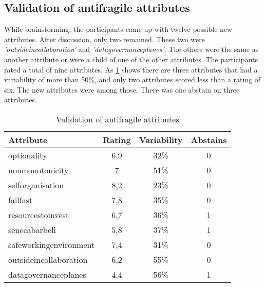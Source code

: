 \subsection{Validation of antifragile attributes}
\label{sub:validationofantifragileattributes}
While brainstorming, the participants came up with twelve possible new \glspl{attribute}. After discussion, only two remained. These two were \textit{'\gls{outsideincollaboration}'} and \textit{'\gls{datagovernanceplanes}'}. The others were the same as another \gls{attribute} or were a child of one of the other \glspl{attribute}. 
The participants rated a total of nine \glspl{attribute}. As \cref{tab:validationofantifragileattributes} shows there are three \glspl{attribute} that had a variability of more than 50\%, and only two \glspl{attribute} scored less than a rating of six. The new \glspl{attribute} were among those. There was one abstain on three \glspl{attribute}.
\begin{table}[H]
	\centering
	\begin{tabular}{p{}ccc}
		\toprule
		\textbf{Attribute} & \textbf{Rating} & \textbf{Variability} & \textbf{Abstains} \\
		\midrule
		\Gls{optionality} & 6,9 & 32\% & 0 \\%
		\Gls{nonmonotonicity} & 7 & 51\% & 0 \\%
		\Gls{selforganisation} & 8,2 & 23\% & 0 \\%
		\Gls{failfast} & 7,8 & 35\% & 0 \\%
		\Gls{resourcestoinvest} & 6,7 & 36\% & 1 \\%
		\Gls{senecabarbell} & 5,8 & 37\% & 1 \\%
		\Gls{safeworkingenvironment} & 7,4 & 31\% & 0 \\%
		\Gls{outsideincollaboration} & 6,2 & 55\% & 0 \\%
		\Gls{datagovernanceplanes} & 4,4 & 56\% & 1 \\%
		\bottomrule
	\end{tabular}%
	\caption{Validation of antifragile attributes}
	\label{tab:validationofantifragileattributes}%
\end{table}%

